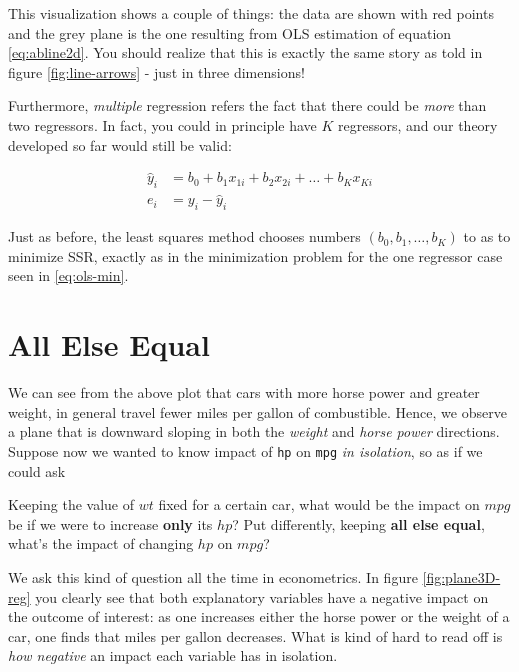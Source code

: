 \documentclass[]{book}
\newenvironment{tip}{\begin{tcolorbox}[colback=green!5!white,colframe=green,title=\textbf{Tip:}]}{\end{tcolorbox}}
\theoremstyle{definition}
\theoremstyle{definition}
\theoremstyle{definition}
\theoremstyle{remark}
\begin{document}
This visualization shows a couple of things: the data are shown with red
points and the grey plane is the one resulting from OLS estimation of
equation \eqref{eq:abline2d}. You should realize that this is exactly the
same story as told in figure \ref{fig:line-arrows} - just in three
dimensions!

Furthermore, \emph{multiple} regression refers the fact that there could
be \emph{more} than two regressors. In fact, you could in principle have
\(K\) regressors, and our theory developed so far would still be valid:

\begin{align}
\hat{y}_i &= b_0 + b_1 x_{1i} +   b_2 x_{2i} + \dots + b_K x_{Ki}\\
e_i &= y_i - \hat{y}_i \label{eq:multiple-reg}
\end{align}

Just as before, the least squares method chooses numbers
\((b_0,b_1,\dots,b_K)\) to as to minimize SSR, exactly as in the
minimization problem for the one regressor case seen in
\eqref{eq:ols-min}.

\section{All Else Equal}\label{ceteris}

We can see from the above plot that cars with more horse power and
greater weight, in general travel fewer miles per gallon of combustible.
Hence, we observe a plane that is downward sloping in both the
\emph{weight} and \emph{horse power} directions. Suppose now we wanted
to know impact of \texttt{hp} on \texttt{mpg} \emph{in isolation}, so as
if we could ask

\begin{tip}
Keeping the value of \(wt\) fixed for a certain car, what would be the
impact on \(mpg\) be if we were to increase \textbf{only} its \(hp\)?
Put differently, keeping \textbf{all else equal}, what's the impact of
changing \(hp\) on \(mpg\)?
\end{tip}

 We ask this kind of question all the time in econometrics. In figure
\ref{fig:plane3D-reg} you clearly see that both explanatory variables
have a negative impact on the outcome of interest: as one increases
either the horse power or the weight of a car, one finds that miles per
gallon decreases. What is kind of hard to read off is \emph{how
negative} an impact each variable has in isolation.
\end{document}
